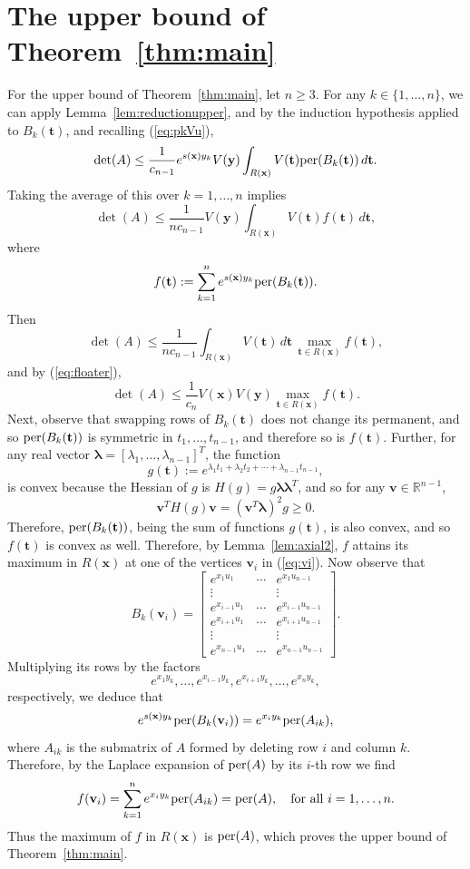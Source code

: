 \documentclass[12pt]{article}
\newcommand{\RR}{\mathbb{R}}
\def\bft{\mathbf{t}}
\def\bfv{\mathbf{v}}
\def\bfx{\mathbf{x}}
\def\bfy{\mathbf{y}}
\def\bflambda{{\boldsymbol \lambda}}
\def\per{{\rm per}}
\begin{document}
\section{The upper bound of Theorem~\ref{thm:main}}

For the upper bound of Theorem~\ref{thm:main},
let $n \ge 3$. For any $k \in \{1,\ldots,n\}$,
we can apply Lemma~\ref{lem:reductionupper}, and by
the induction hypothesis applied to $B_k(\bft)$,
and recalling (\ref{eq:pkVu}),
$$
\det(A) \le \frac{1}{c_{n-1}} e^{s(\bfx)y_k} V(\bfy)
\int_{R(\bfx)} V(\bft) \per(B_k(\bft)) \, d\bft.
$$
Taking the average of this over $k=1,\ldots,n$ implies
$$ \det(A) \le \frac{1}{n c_{n-1}} V(\bfy)
\int_{R(\bfx)} V(\bft) f(\bft) \, d\bft, $$
where
$$ f(\bft) := \sum_{k=1}^n e^{s(\bfx)y_k} \per(B_k(\bft)). $$
Then
$$ \det(A) \le \frac{1}{n c_{n-1}} 
\int_{R(\bfx)} V(\bft) \, d\bft \,
\max_{\bft \in R(\bfx)} f(\bft), $$
and by (\ref{eq:floater}),
$$ \det(A) \le \frac{1}{c_n} V(\bfx) V(\bfy)
\max_{\bft \in R(\bfx)} f(\bft). $$
Next, observe that swapping rows of $B_k(\bft)$ does not change its
permanent, and so $\per(B_k(\bft))$
is symmetric in $t_1,\ldots,t_{n-1}$, and therefore so is $f(\bft)$.
Further, for any real vector
$\bflambda = [\lambda_1,\ldots,\lambda_{n-1}]^T$,
the function
$$ g(\bft) := e^{\lambda_1 t_1 + \lambda_2 t_2 + \cdots + \lambda_{n-1} t_{n-1}}, $$
is convex because
the Hessian of $g$ is $H(g) = g \bflambda \bflambda^T$,
and so for any $\bfv \in \RR^{n-1}$,
$$ \bfv^T H(g) \bfv = (\bfv^T\bflambda)^2 g \ge 0. $$
Therefore, $\per(B_k(\bft))$, being the sum of
functions $g(\bft)$, is also convex, and so $f(\bft)$
is convex as well.
Therefore, by Lemma~\ref{lem:axial2},
$f$ attains its maximum in $R(\bfx)$ at one of the vertices
$\bfv_i$ in (\ref{eq:vi}).
Now observe that
$$
B_k(\bfv_i) = \left[
\begin{matrix}
e^{x_1 u_1} & \cdots & e^{x_1 u_{n-1}} \\
\vdots & & \vdots \\
e^{x_{i-1} u_1} & \cdots & e^{x_{i-1} u_{n-1}} \\
e^{x_{i+1} u_1} & \cdots & e^{x_{i+1} u_{n-1}} \\
\vdots & & \vdots \\
e^{x_{n-1} u_1} & \cdots & e^{x_{n-1} u_{n-1}}
\end{matrix}
\right].
$$
Multiplying its rows by the factors
$$ e^{x_1y_k},\ldots,e^{x_{i-1}y_k},
e^{x_{i+1}y_k},\ldots,e^{x_ny_k}, $$
respectively, we deduce that
$$ e^{s(\bfx)y_k} \per(B_k(\bfv_i)) = e^{x_iy_k} \per(A_{ik}), $$
where
$A_{ik}$ is the submatrix of $A$ formed by deleting
row $i$ and column $k$. Therefore, by the Laplace
expansion of $\per(A)$ by its $i$-th row we find
$$ f(\bfv_i) = \sum_{k=1}^n e^{x_iy_k} \per(A_{ik}) = \per(A),
\quad \hbox{for all $i=1,\ldots,n$.} $$
Thus the maximum of $f$ in $R(\bfx)$ is $\per(A)$,
which proves the upper bound of Theorem~\ref{thm:main}.
\end{document}

